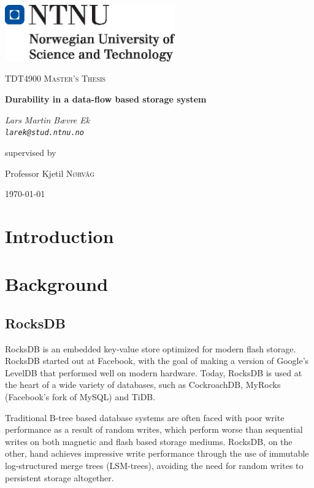 \documentclass[b5paper]{report}
\begin{document}
\begin{titlepage}
  \centering
	\includegraphics[width=0.55\textwidth]{ntnu}\par\vspace{1cm}
	{\scshape\Large TDT4900 Master's Thesis \par}
	\vspace{1.5cm}
	{\huge\bfseries Durability in a data-flow based storage system\par}
	\vspace{2cm}
	{\Large\itshape Lars Martin Bævre Ek \\ \texttt{larek@stud.ntnu.no} \par}
	\vfill
	supervised by\par
  Professor Kjetil \textsc{Nørvåg}

	{\large \today\par}
\end{titlepage}



\begin{abstract}
\end{abstract}

\tableofcontents
\pagebreak

\chapter{Introduction}

\chapter{Background} \label{chap:background}

\section{RocksDB}
RocksDB is an embedded key-value store optimized for modern flash storage.
RocksDB started out at Facebook, with the goal of making a version of Google's
LevelDB that performed well on modern hardware. Today, RocksDB is used at the
heart of a wide variety of databases, such as CockroachDB, MyRocks (Facebook's
fork of MySQL) and TiDB.

Traditional B-tree based database systems are often faced with poor write
performance as a result of random writes, which perform worse than sequential
writes on both magnetic and flash based storage mediums. RocksDB, on the other,
hand achieves impressive write performance through the use of immutable
log-structured merge trees (LSM-trees), avoiding the need for random writes to
persistent storage altogether.
\end{document}

